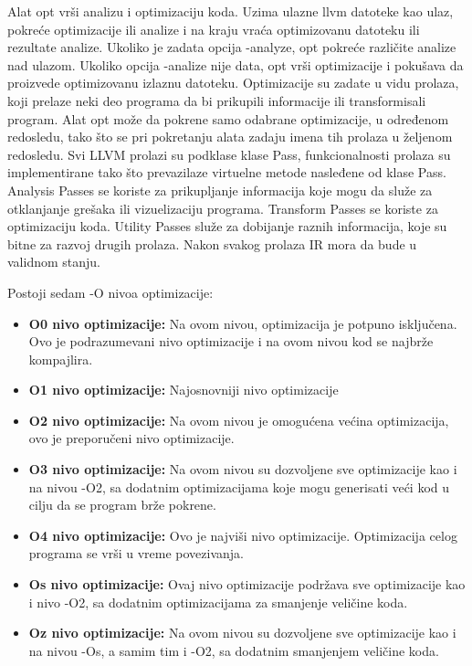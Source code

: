 \documentclass[a4paper]{article}
\begin{document}
Alat opt vrši analizu i optimizaciju koda. Uzima ulazne llvm datoteke kao ulaz, pokreće optimizacije ili analize i na kraju vraća optimizovanu datoteku ili rezultate analize. Ukoliko je zadata opcija -analyze, opt pokreće različite analize nad ulazom. Ukoliko opcija  -analize nije data, opt vrši optimizacije i pokušava da proizvede optimizovanu izlaznu datoteku. Optimizacije su zadate u vidu prolaza, koji prelaze neki deo programa da bi prikupili informacije ili transformisali program. Alat opt može da pokrene samo odabrane optimizacije, u određenom redosledu, tako što se pri pokretanju alata zadaju imena tih prolaza u željenom redosledu. Svi LLVM prolazi su podklase klase Pass, funkcionalnosti prolaza su implementirane tako što prevazilaze virtuelne metode nasleđene od klase Pass. Analysis Passes se koriste za prikupljanje informacija koje mogu da služe za otklanjanje grešaka ili vizuelizaciju programa. Transform Passes se koriste za optimizaciju koda. Utility Passes služe za dobijanje raznih informacija, koje su bitne za razvoj drugih prolaza. Nakon svakog prolaza IR mora da bude u validnom stanju.

Postoji sedam -O nivoa optimizacije: 
\begin{itemize}
\item \textbf{O0 nivo optimizacije:} Na ovom nivou, optimizacija je potpuno isključena. Ovo je podrazumevani nivo optimizacije i na ovom nivou kod se najbrže kompajlira.
\item \textbf{O1 nivo optimizacije:} Najosnovniji nivo optimizacije 
\item \textbf{O2 nivo optimizacije:} Na ovom nivou je omogućena većina optimizacija, ovo je preporučeni nivo optimizacije.
\item \textbf{O3 nivo optimizacije:} Na ovom nivou su dozvoljene sve optimizacije kao i na nivou -O2, sa dodatnim optimizacijama koje mogu generisati veći kod u cilju da se program brže pokrene.
\item \textbf{O4 nivo optimizacije:} Ovo je najviši nivo optimizacije. Optimizacija celog programa se vrši u vreme povezivanja. 
\item \textbf{Os nivo optimizacije:} Ovaj nivo optimizacije podržava sve optimizacije kao i nivo -O2, sa dodatnim optimizacijama za smanjenje veličine koda.
\item \textbf{Oz nivo optimizacije:} Na ovom nivou su dozvoljene sve optimizacije kao i na nivou -Os, a samim tim i -O2,  sa dodatnim smanjenjem veličine koda. \cite{opt} \cite{pass} \cite{pass2}
\end{itemize}
\end{document}
